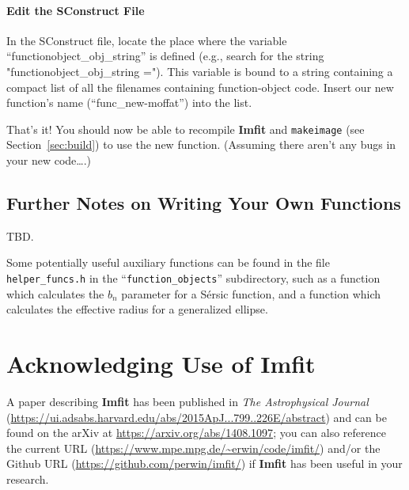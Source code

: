 \documentclass[10pt,a4paper,article]{memoir}
\newcommand{\imfit}{\textbf{Imfit}}
\newcommand{\Imfit}{\textbf{Imfit}}
\newcommand{\makeimage}{\texttt{makeimage}}
\begin{document}
\subsubsection{Edit the SConstruct File}

In the SConstruct file, locate the place where the variable
``functionobject\_obj\_string'' is defined (e.g., search for the string
"functionobject\_obj\_string ="). This variable is bound to a string containing a
compact list of all the filenames containing function-object code. Insert our
new function's name (``func\_new-moffat'') into the list.

\bigskip

That's it! You should now be able to recompile \imfit{} and \makeimage{} 
(see Section~\ref{sec:build}) to use
the new function. (Assuming there aren't any bugs in your new code\ldots.)



\section{Further Notes on Writing Your Own Functions}

TBD.

Some potentially useful auxiliary functions can be found in the file
\texttt{helper\_funcs.h} in the ``\texttt{function\_objects}'' subdirectory,
such as a function which calculates the $b_{n}$ parameter for a S\'ersic
function, and a function which calculates the effective radius for a
generalized ellipse.

%
%



\newpage

\chapter{Acknowledging Use of \Imfit}

A paper describing \imfit{} \citep{erwin15} has been published in
\textit{The Astrophysical Journal}
(\url{https://ui.adsabs.harvard.edu/abs/2015ApJ...799..226E/abstract}) and can be
found on the arXiv at \url{https://arxiv.org/abs/1408.1097}; you can also
reference the current URL
(\url{https://www.mpe.mpg.de/~erwin/code/imfit/}) and/or the Github URL
(\url{https://github.com/perwin/imfit/}) if \imfit{} has been useful in
your research.
\end{document}
